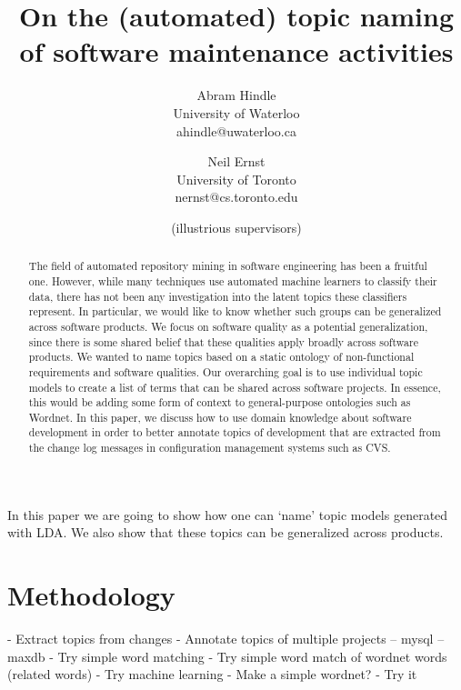 \documentclass[times, 10pt,twocolumn]{article}
\begin{document}
\title{On the (automated) topic naming of software maintenance activities}

\author{Abram Hindle\\
University of Waterloo\\ ahindle@uwaterloo.ca\\
\and
Neil Ernst\\
University of Toronto\\ 
nernst@cs.toronto.edu\\

\and
(illustrious supervisors)\\
}

\maketitle
\thispagestyle{empty}

\begin{abstract}
	The field of automated repository mining in software engineering has been a fruitful one. However, while many techniques use automated machine learners to classify their data, there has not been any investigation into the latent topics these classifiers represent. In particular, we would like to know whether such groups can be generalized across software products. We focus on software quality as a potential generalization, since there is some shared belief that these qualities apply broadly across software products. We wanted to name topics based on a static ontology of non-functional requirements and software qualities. Our overarching goal is to use individual topic models to create a list of terms that can be shared across software projects. In essence, this would be adding some form of context to general-purpose ontologies such as Wordnet. In this paper, we discuss how to use domain knowledge about software development in order to better annotate topics of development that are extracted from the change log messages in configuration management systems such as CVS.
\end{abstract}



In this paper we are going to show how one can `name' topic models generated with LDA. We also show that these topics can be generalized across products. 


\section{Methodology}
- Extract topics from changes
- Annotate topics of multiple projects
-- mysql
-- maxdb
- Try simple word matching
- Try simple word match of wordnet words (related words)
- Try machine learning
- Make a simple wordnet?
- Try it
\end{document}
